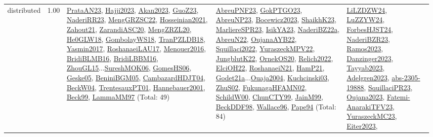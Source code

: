 {\begin{longtable}{p{3cm}r>{\raggedright\arraybackslash}p{6cm}>{\raggedright\arraybackslash}p{6cm}>{\raggedright\arraybackslash}p{8cm}}
\index{distributed}\index{Concepts!distributed}distributed &  1.00 & \hyperref[detail:PrataAN23]{PrataAN23}, \hyperref[detail:Hajji2023]{Hajji2023}, \hyperref[detail:Akan2023]{Akan2023}, \hyperref[detail:GuoZ23]{GuoZ23}, \hyperref[detail:NaderiRR23]{NaderiRR23}, \hyperref[detail:MengGRZSC22]{MengGRZSC22}, \hyperref[detail:Hosseinian2021]{Hosseinian2021}, \hyperref[detail:Zahout21]{Zahout21}, \hyperref[detail:ZarandiASC20]{ZarandiASC20}, \hyperref[detail:MengZRZL20]{MengZRZL20}, \hyperref[detail:He0GLW18]{He0GLW18}, \hyperref[detail:GombolayWS18]{GombolayWS18}, \hyperref[detail:TranPZLDB18]{TranPZLDB18}, \hyperref[detail:Yasmin2017]{Yasmin2017}, \hyperref[detail:RoshanaeiLAU17]{RoshanaeiLAU17}, \hyperref[detail:Menouer2016]{Menouer2016}, \hyperref[detail:BridiBLMB16]{BridiBLMB16}, \hyperref[detail:BridiLBBM16]{BridiLBBM16}, \hyperref[detail:ZhouGL15]{ZhouGL15}...\hyperref[detail:SureshMOK06]{SureshMOK06}, \hyperref[detail:GomesHS06]{GomesHS06}, \hyperref[detail:Geske05]{Geske05}, \hyperref[detail:BeniniBGM05]{BeniniBGM05}, \hyperref[detail:CambazardHDJT04]{CambazardHDJT04}, \hyperref[detail:BeckW04]{BeckW04}, \hyperref[detail:TrentesauxPT01]{TrentesauxPT01}, \hyperref[detail:Hannebauer2001]{Hannebauer2001}, \hyperref[detail:Beck99]{Beck99}, \hyperref[detail:LammaMM97]{LammaMM97} (Total: 49) & \hyperref[detail:AbreuPNF23]{AbreuPNF23}, \hyperref[detail:GokPTGO23]{GokPTGO23}, \hyperref[detail:AbreuNP23]{AbreuNP23}, \hyperref[detail:Bocewicz2023]{Bocewicz2023}, \hyperref[detail:ShaikhK23]{ShaikhK23}, \hyperref[detail:MarliereSPR23]{MarliereSPR23}, \hyperref[detail:IsikYA23]{IsikYA23}, \hyperref[detail:NaderiBZ22a]{NaderiBZ22a}, \hyperref[detail:AbreuN22]{AbreuN22}, \hyperref[detail:OujanaAYB22]{OujanaAYB22}, \hyperref[detail:Squillaci2022]{Squillaci2022}, \hyperref[detail:YuraszeckMPV22]{YuraszeckMPV22}, \hyperref[detail:JungblutK22]{JungblutK22}, \hyperref[detail:OrnekOS20]{OrnekOS20}, \hyperref[detail:Relich2022]{Relich2022}, \hyperref[detail:ElciOH22]{ElciOH22}, \hyperref[detail:RoshanaeiN21]{RoshanaeiN21}, \hyperref[detail:HamP21]{HamP21}, \hyperref[detail:Godet21a]{Godet21a}...\hyperref[detail:Ouaja2004]{Ouaja2004}, \hyperref[detail:Kuchcinski03]{Kuchcinski03}, \hyperref[detail:ZhuS02]{ZhuS02}, \hyperref[detail:FukunagaHFAMN02]{FukunagaHFAMN02}, \hyperref[detail:SchildW00]{SchildW00}, \hyperref[detail:ChunCTY99]{ChunCTY99}, \hyperref[detail:JainM99]{JainM99}, \hyperref[detail:BeckDDF98]{BeckDDF98}, \hyperref[detail:Wallace96]{Wallace96}, \hyperref[detail:Pape94]{Pape94} (Total: 84) & \hyperref[detail:LiLZDZW24]{LiLZDZW24}, \hyperref[detail:LuZZYW24]{LuZZYW24}, \hyperref[detail:ForbesHJST24]{ForbesHJST24}, \hyperref[detail:NaderiBZR23]{NaderiBZR23}, \hyperref[detail:Ramos2023]{Ramos2023}, \hyperref[detail:Danzinger2023]{Danzinger2023}, \hyperref[detail:Tayyab2023]{Tayyab2023}, \hyperref[detail:Adelgren2023]{Adelgren2023}, \hyperref[detail:abs-2305-19888]{abs-2305-19888}, \hyperref[detail:SquillaciPR23]{SquillaciPR23}, \hyperref[detail:Oujana2023]{Oujana2023}, \hyperref[detail:Fatemi-AnarakiTFV23]{Fatemi-AnarakiTFV23}, \hyperref[detail:YuraszeckMC23]{YuraszeckMC23}, \hyperref[detail:Eiter2023]{Eiter2023}, 
\end{longtable}}
